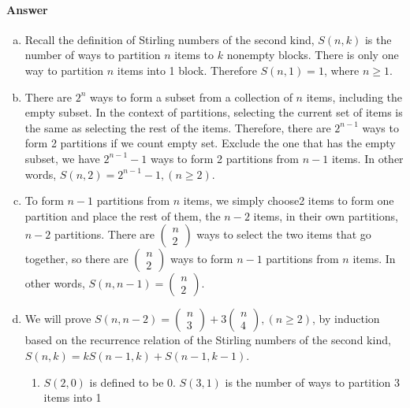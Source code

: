 \documentclass[UTF8]{article}
\begin{document}
\paragraph{Answer}
\begin{enumerate}[(a)]
    \item Recall the definition of Stirling numbers of the second kind, $ S(n,k) $ is the number of ways to
    partition $ n $ items to $ k $ nonempty blocks. There is only one way to partition $ n $ items into 1 block.
    Therefore $ S(n , 1) = 1$, where $ n \geq 1 $. 
    \item There are $ 2^n $ ways to form a subset from a collection of $ n $ items, including the empty subset. In
   the context of partitions, selecting the current set of items is the same as selecting the rest of the items. Therefore, there are $ 2^{n - 1} $ ways to form
    2 partitions if we count empty set. Exclude the one that has the empty subset, we have $ 2^{n - 1}  - 1$ ways to form 2 partitions from $ n - 1 $ items. In
   other words, $ S(n , 2) = 2^{n - 1} - 1, (n \geq 2) $. 
    \item To form $ n - 1 $ partitions from $ n $ items, we simply choose2 items to form one partition and place
    the rest of them, the $n - 2$ items, in their own partitions, $n - 2$ partitions. There are $ \begin{pmatrix} n \\ 2 \end{pmatrix} $ ways
    to select the two items that go together, so there are $ \begin{pmatrix} n \\ 2 \end{pmatrix} $ ways to form $n - 1$ partitions from $ n $
    items. In other words, $ S(n , n - 1) = \begin{pmatrix} n \\ 2 \end{pmatrix} $. 
    \item We will prove $ S(n , n - 2) = \begin{pmatrix} n \\ 3 \end{pmatrix} + 3 \begin{pmatrix} n \\ 4 \end{pmatrix}, (n \geq 2) $, by induction based on the recurrence
    relation of the Stirling numbers of the second kind,$ S(n , k) = kS(n - 1,k) + S(n - 1,k - 1)$. 
        \begin{enumerate}[1]
            \item $S(2,0)$ is defined to be 0. $S(3,1)$ is the number of ways to partition 3 items into 1

\end{enumerate}
\end{enumerate}
\end{document}
